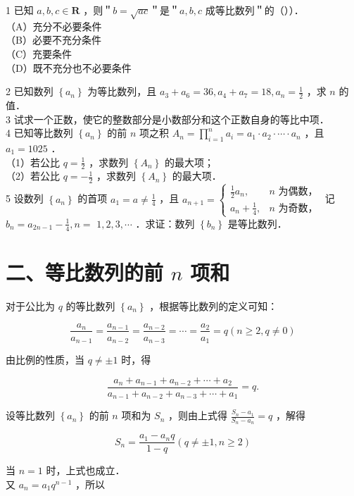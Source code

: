\documentclass[10pt]{article}
\begin{document}
1 已知 \(a, b, c \in \mathbf{R}\) ，则＂\(b=\sqrt{a c}\)＂是＂\(a, b, c\) 成等比数列＂的（））．\\
（A）充分不必要条件\\
（B）必要不充分条件\\
（C）充要条件\\
（D）既不充分也不必要条件

2 已知数列 \(\left\{a_{n}\right\}\) 为等比数列，且 \(a_{3}+a_{6}=36, a_{4}+a_{7}=18, a_{n}=\frac{1}{2}\) ，求 \(n\) 的值．\\
3 试求一个正数，使它的整数部分是小数部分和这个正数自身的等比中项．\\
4 已知等比数列 \(\left\{a_{n}\right\}\) 的前 \(n\) 项之积 \(A_{n}=\prod_{i=1}^{n} a_{i}=a_{1} \cdot a_{2} \cdot \cdots \cdot a_{n}\) ，且 \(a_{1}=1025\) ．\\
（1）若公比 \(q=\frac{1}{2}\) ，求数列 \(\left\{A_{n}\right\}\) 的最大项；\\
（2）若公比 \(q=-\frac{1}{2}\) ，求数列 \(\left\{A_{n}\right\}\) 的最大项．\\
5 设数列 \(\left\{a_{n}\right\}\) 的首项 \(a_{1}=a \neq \frac{1}{4}\) ，且 \(a_{n+1}=\left\{\begin{array}{ll}\frac{1}{2} a_{n}, & n \text { 为偶数，} \\ a_{n}+\frac{1}{4}, & n \text { 为奇数，}\end{array}\right.\) 记 \(b_{n}=a_{2 n-1}-\frac{1}{4}, n=\) \(1,2,3, \cdots\) ．求证：数列 \(\left\{b_{n}\right\}\) 是等比数列．

\section*{二、等比数列的前 \(n\) 项和}
对于公比为 \(q\) 的等比数列 \(\left\{a_{n}\right\}\) ，根据等比数列的定义可知：

\[
\frac{a_{n}}{a_{n-1}}=\frac{a_{n-1}}{a_{n-2}}=\frac{a_{n-2}}{a_{n-3}}=\cdots=\frac{a_{2}}{a_{1}}=q(n \geqslant 2, q \neq 0)
\]

由比例的性质，当 \(q \neq \pm 1\) 时，得

\[
\frac{a_{n}+a_{n-1}+a_{n-2}+\cdots+a_{2}}{a_{n-1}+a_{n-2}+a_{n-3}+\cdots+a_{1}}=q .
\]

设等比数列 \(\left\{a_{n}\right\}\) 的前 \(n\) 项和为 \(S_{n}\) ，则由上式得 \(\frac{S_{n}-a_{1}}{S_{n}-a_{n}}=q\) ，解得

\[
S_{n}=\frac{a_{1}-a_{n} q}{1-q}(q \neq \pm 1, n \geqslant 2)
\]

当 \(n=1\) 时，上式也成立．\\
又 \(a_{n}=a_{1} q^{n-1}\) ，所以
\end{document}
